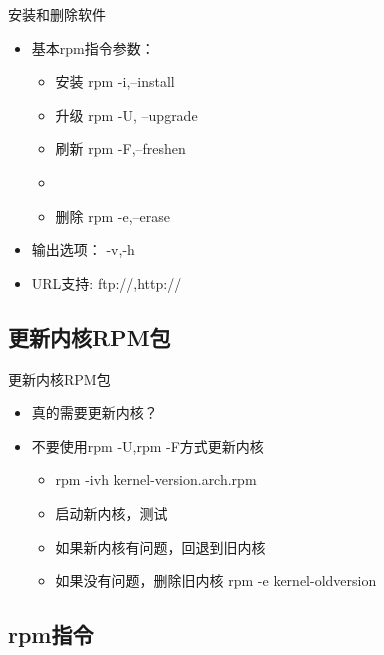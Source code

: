 \begin{frame}{安装和删除软件}
\begin{itemize}
\item 基本rpm指令参数：

\begin{itemize}
\item 安装 rpm -i,--install
\item 升级 rpm -U, --upgrade
\item 刷新 rpm -F,--freshen
\item 
\item 删除 rpm -e,--erase
\end{itemize}
\item 输出选项： -v,-h
\item URL支持: ftp://,http://
\end{itemize}
\end{frame} 

\subsection{更新内核RPM包}


\begin{frame}{更新内核RPM包}
\begin{itemize}
\item 真的需要更新内核？
\item \alert{不要使用rpm -U,rpm -F方式更新内核}

\begin{itemize}
\item rpm -ivh kernel-version.arch.rpm
\item 启动新内核，测试
\item 如果新内核有问题，回退到旧内核
\item 如果没有问题，删除旧内核 rpm -e kernel-oldversion
\end{itemize}
\end{itemize}
\end{frame} 

\subsection{rpm指令}



